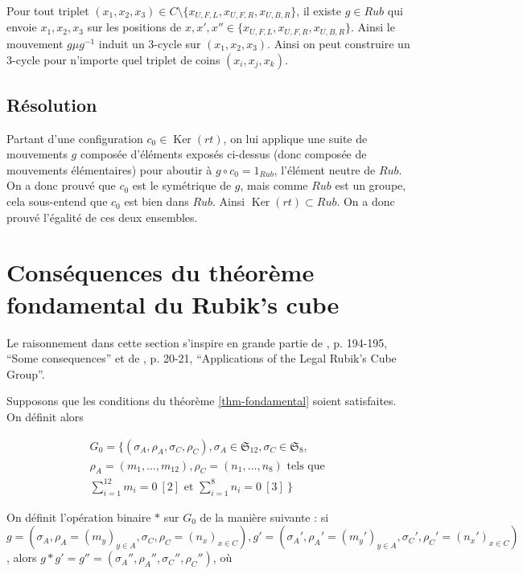 \documentclass[french]{report}
\begin{document}
Pour tout triplet $(x_1,x_2,x_3) \in C \setminus \{ x _{U,F,L}, x _{U,F,R}, x _{U,B,R} \} $, il existe $g \in Rub$ qui envoie $x_1, x_2, x_3$ sur les positions de $x,x',x'' \in \{ x _{U,F,L}, x _{U,F,R}, x _{U,B,R}\} $. Ainsi le mouvement $g \mu g ^{-1} $ induit un 3-cycle sur $(x_1,x_2,x_3)$. Ainsi on peut construire un 3-cycle pour n'importe quel triplet de coins $(x_i,x_j,x_k)$.

\subsection{Résolution}

Partant d'une configuration $c_0 \in \operatorname{Ker}(rt)$, on lui applique une suite de mouvements $g$ composée d'éléments exposés ci-dessus (donc composée de mouvements élémentaires) pour aboutir à $g \circ c_0 = 1 _{Rub}$, l'élément neutre de $Rub$. On a donc prouvé que $c_0$ est le symétrique de $g$, mais comme $Rub$ est un groupe, cela sous-entend que $c_0$ est bien dans $Rub$. Ainsi $\operatorname{Ker}(rt) \subset Rub$. On a donc prouvé l'égalité de ces deux ensembles.

\section{Conséquences du théorème fondamental du Rubik's cube}

Le raisonnement dans cette section s'inspire en grande partie de \cite{math_rubik}, p. 194-195, ``Some consequences'' et de \cite{daniels}, p. 20-21, ``Applications of the Legal Rubik’s Cube Group''.

Supposons que les conditions du théorème \ref{thm-fondamental} soient satisfaites. On définit alors

\begin{gather}
  G_0 = \{  (\sigma_A, \rho_A, \sigma_C, \rho_C), \sigma_A \in \mathfrak{S}_{12}, \sigma_C \in \mathfrak{S}_{8},\\
  \rho_A = (m_1, \dots, m _{12}), \rho_C =(n_1, \dots, n_8) \text{ tels que } \\
  \sum_{i=1}^{12} m_i = 0 \ [2]  \text{ et } \sum_{i=1}^{8}  n_i = 0 \ [3] \ \}
\end{gather}

On définit l'opération binaire $*$ sur $G_0$ de la manière suivante : si $g = (\sigma_A, \rho_A =(m_y) _{y \in A}, \sigma_C, \rho_C = (n_x) _{x \in C}), g' = (\sigma_A', \rho_A' = (m_y') _{y \in A}, \sigma_C', \rho_C' = (n_x') _{x \in C})$, alors $g *g' = g'' = (\sigma_A'', \rho_A'', \sigma_C'', \rho_C'')$, où
\end{document}
